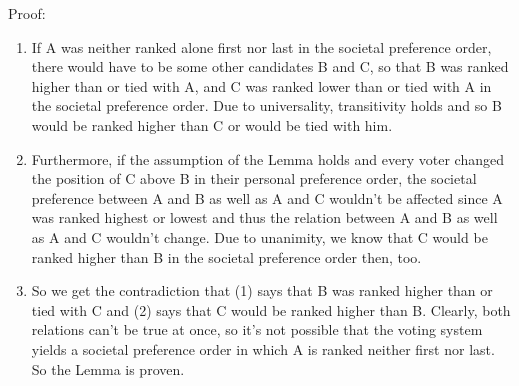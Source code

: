 Proof: %
\begin{enumerate} 
\item If A was neither ranked alone first nor last in the societal preference order, there would have to be some other candidates B and C, so that B was ranked higher than or tied with A, and C was ranked lower than or tied with A in the societal preference order. 
Due to universality, transitivity holds and so B would be ranked higher than C or would be tied with him. \\

\item Furthermore, if the assumption of the Lemma holds and every voter changed the position of C above B in their personal preference order, the societal preference between A and B as well as A and C wouldn't be affected since A was ranked highest or lowest and thus the relation between A and B as well as A and C wouldn't change. Due to unanimity, we know that C would be ranked higher than B in the societal preference order then, too. 

\item So we get the contradiction that (1) says that B was ranked higher than or tied with C and (2) says that C would be ranked higher than B. Clearly, both relations can't be true at once, so it's not possible that the voting system yields a societal preference order in which A is ranked neither first nor last. So the Lemma is proven. 
\end{enumerate}

